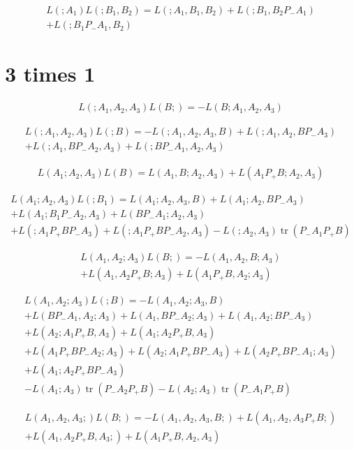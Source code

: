 \documentclass[b5paper,draft,openbib,12pt]{memoir}
\DeclareMathOperator{\tr}{tr}
\begin{document}
\begin{multline}
L(;A_1)L(;B_1,B_2) = L(;A_1,B_1,B_2) + L(;B_1,B_2P_-A_1) \\
+ L(;B_1P_-A_1,B_2)
\end{multline}

\section{3 times 1}
\begin{multline}
L(;A_1,A_2,A_3)L(B;)= -L(B;A_1,A_2,A_3)
\end{multline}

\begin{multline}
L(;A_1,A_2,A_3)L(;B) = -L(;A_1,A_2,A_3,B) +L(;A_1,A_2,BP_-A_3)\\
+L(;A_1,BP_-A_2,A_3)+L(;BP_-A_1,A_2,A_3)
\end{multline}

\begin{multline}
L(A_1;A_2,A_3)L(B)=L(A_1,B;A_2,A_3)+L(A_1P_+B;A_2,A_3)
\end{multline}

\begin{multline}
L(A_1;A_2,A_3)L(;B_1)= L(A_1;A_2,A_3,B) + L(A_1;A_2,BP_-A_3) \\
+ L(A_1;B_1P_-A_2,A_3) + L(BP_-A_1;A_2,A_3) \\
+L(;A_1P_+BP_-A_3) + L(;A_1P_+BP_-A_2,A_3) - L(;A_2,A_3) \tr(P_-A_1P_+B)
\end{multline}

\begin{multline}
L(A_1,A_2;A_3)L(B;)=-L(A_1,A_2,B;A_3) \\
+ L(A_1,A_2P_+B;A_3) + L(A_1P_+B,A_2;A_3)
\end{multline}

\begin{multline}
L(A_1,A_2;A_3)L(;B) = -L(A_1,A_2;A_3,B) \\
+ L(BP_-A_1,A_2;A_3) + L(A_1, BP_-A_2;A_3) + L(A_1,A_2;BP_-A_3)\\
+L(A_2;A_1P_+B,A_3) + L(A_1;A_2P_+B,A_3)\\
+L(A_1P_+BP_-A_2;A_3) + L(A_2;A_1P_+BP_-A_3) + L(A_2P_+BP_-A_1;A_3)\\
+L(A_1;A_2P_+BP_-A_3)\\
-L(A_1;A_3) \tr(P_-A_2P_+B) - L(A_2;A_3) \tr(P_-A_1P_+B)
\end{multline}

\begin{multline}
L(A_1,A_2,A_3;)L(B;)= -L(A_1,A_2,A_3,B;) + L(A_1,A_2,A_3P_+B;)\\
+ L(A_1,A_2P_+B,A_3;) +L(A_1P_+B,A_2,A_3)
\end{multline}
\end{document}
